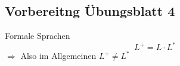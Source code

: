 \subsection{Vorbereitng Übungsblatt 4}
\begin{frame}{Formale Sprachen}
    \[
    	L^+ = L \cdot L^*
    \]
    $\Rightarrow$ Also im Allgemeinen $L^+\ne L^*$
\end{frame}